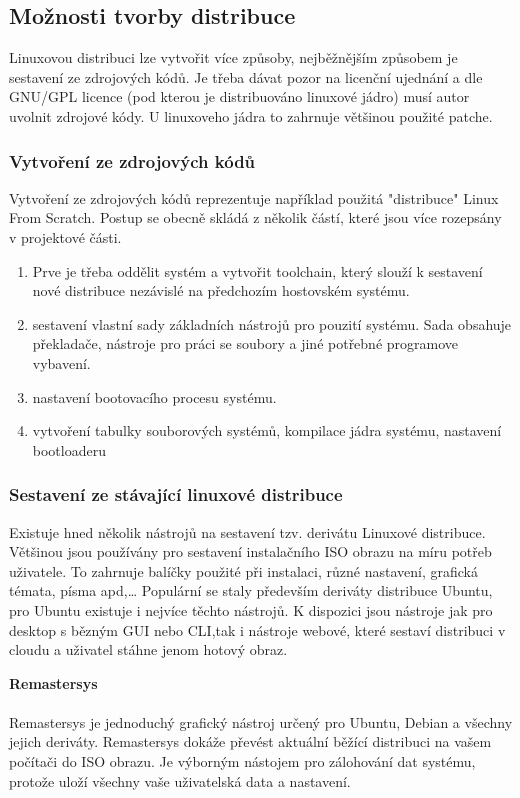 \documentclass[a4paper,12pt]{article}
\newcommand{\nadpis}[1]{%
	\vspace{4 mm}
	\textbf{#1}\\
	\vspace{4 mm}
	}
\begin{document}
\subsection{Možnosti tvorby distribuce}
Linuxovou distribuci lze vytvořit více způsoby, nejběžnějším způsobem je sestavení ze zdrojových kódů. Je třeba dávat pozor na licenční ujednání a dle GNU/GPL licence (pod kterou je distribuováno linuxové jádro) musí autor uvolnit zdrojové kódy. U linuxoveho jádra to zahrnuje většinou použité patche.
\subsubsection{Vytvoření ze zdrojových kódů}
Vytvoření ze zdrojových kódů reprezentuje například použitá "distribuce" Linux From Scratch. Postup se obecně skládá z několik částí, které jsou více rozepsány v projektové části. %
\begin{enumerate}
 \item Prve je třeba oddělit systém a vytvořit toolchain, který slouží k sestavení nové distribuce nezávislé na předchozím hostovském systému.
\item sestavení vlastní sady základních nástrojů pro pouzití systému. Sada obsahuje překladače, nástroje pro práci se soubory a jiné potřebné programove vybavení.
\item nastavení bootovacího procesu systému.
\item vytvoření tabulky souborových systémů, kompilace jádra systému, nastavení bootloaderu
\end{enumerate}

\subsubsection{Sestavení ze stávající linuxové distribuce}
Existuje hned několik nástrojů na sestavení tzv. derivátu Linuxové distribuce. Většinou jsou používány pro sestavení instalačního ISO obrazu na míru potřeb uživatele. To zahrnuje balíčky použité při instalaci, různé nastavení, grafická témata, písma apd,… Populární se staly především deriváty distribuce Ubuntu, pro Ubuntu existuje i nejvíce těchto nástrojů. K dispozici jsou nástroje jak pro desktop s bězným GUI nebo CLI,tak i nástroje webové, které sestaví distribuci v cloudu a uživatel stáhne jenom hotový obraz.

\nadpis{Remastersys}\\
Remastersys je jednoduchý grafický nástroj určený pro Ubuntu, Debian a všechny jejich deriváty. Remastersys dokáže převést aktuální běžící distribuci na vašem počítači do ISO obrazu. Je výborným nástojem pro zálohování dat systému, protože uloží všechny vaše uživatelská data a nastavení.\cite{Linux_Build}
\end{document}
